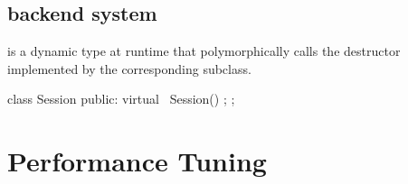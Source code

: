 \begin{content}
\subsection{backend system}

 is a dynamic type at runtime that polymorphically calls the destructor implemented by the corresponding subclass.

\begin{leftbar}
\begin{c++}[caption={tensorflow/core/common\_runtime/session.h}]
class Session {
public:
  virtual ~Session() {};
};
\end{c++}
\end{leftbar}

\end{content}

\section{Performance Tuning}

